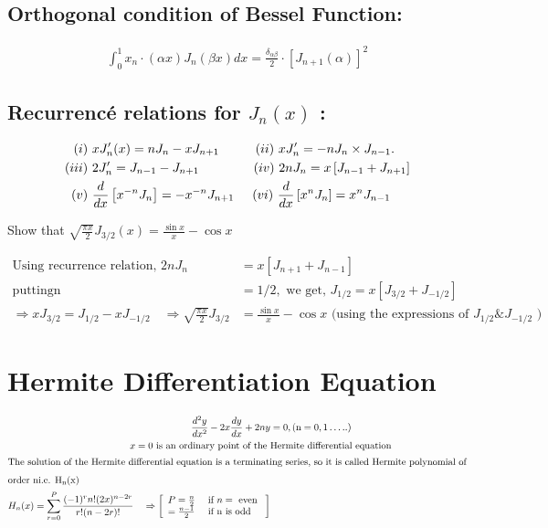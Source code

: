 \subsection{Orthogonal condition of Bessel Function:}
\begin{align*}
\int_{0}^{1} x_{n} \cdot(\alpha x) J_{n}(\beta x) d x=\frac{\delta_{\alpha \beta}}{2} \cdot\left[J_{n+1}(\alpha)\right]^{2}
\end{align*}
\subsection{Recurrencé relations for $J_{n}(x)$ :}
\begin{align*}
(i)\ & x J_{n}^{\prime}(x)=n J_{n}-x J_{n+1}\hspace{1cm}(ii)\  x J_{n}^{\prime}=-n J_{n} \times J_{n-1}.\\
(iii)\ & 2 J_{n}^{\prime}=J_{n-1}-J_{n+1}\hspace{1.5cm}(iv)\  2 n J_{n}=x\left[J_{n-1}+J_{n+1}\right]\\
(v)\ & \frac{d}{d x}\left[x^{-n} J_{n}\right]=-x^{-n} J_{n+1} \hspace{.5cm} (vi)\  \frac{d}{d x}\left[x^{n} J_{n}\right]=x^{n} J_{n-1}
\end{align*}
\begin{exercise}
	Show that $\sqrt{\frac{\pi x}{2}} J_{3 / 2}(x)=\frac{\sin x}{x}-\cos x$
\end{exercise}
\begin{answer}
	\begin{align*}
	\text{Using recurrence relation, }2 n J_{n}&=x\left[J_{n+1}+J_{n-1}\right]\\
	\text{putting}\mathrm{n}&=1 / 2,\text{ we get, }J_{1 / 2}=x\left[J_{3 / 2}+J_{-1 / 2}\right]\\
	\Rightarrow x J_{3 / 2}=J_{1 / 2}-x J_{-1 / 2} \quad \Rightarrow \sqrt{\frac{\pi x}{2}} J_{3 / 2}&=\frac{\sin x}{x}-\cos x \text { (using the expressions of } J_{1 / 2} \& J_{-1 / 2} \text { ) }
	\end{align*}
\end{answer}
\section{Hermite Differentiation Equation}
\begin{align*}
\frac{d^{2} y}{d x^{2}}-2 x \frac{d y}{d x}+2 n y&=0,(\mathrm{n}=0,1 \ldots . .)\\
\text{$x=0$ is an ordinary point of the }&\text{Hermite differential equation}\\
\intertext{The solution of the Hermite differential equation is a terminating series, so it is called Hermite polynomial of}
\intertext{order ni.e. $\mathrm{H}_{\mathrm{n}}(\mathrm{x})$}
H_{n}(x)=\sum_{r=0}^{P} \frac{(-1)^{r} n !(2 x)^{n-2 r}}{r !(n-2 r) !} \quad \Rightarrow\left[\begin{array}{ll}
P=\frac{n}{2} & \text { if } n=\text { even } \\
=\frac{n-1}{2} & \text { if } \mathrm{n} \text { is odd }
\end{array}\right]
\end{align*}
